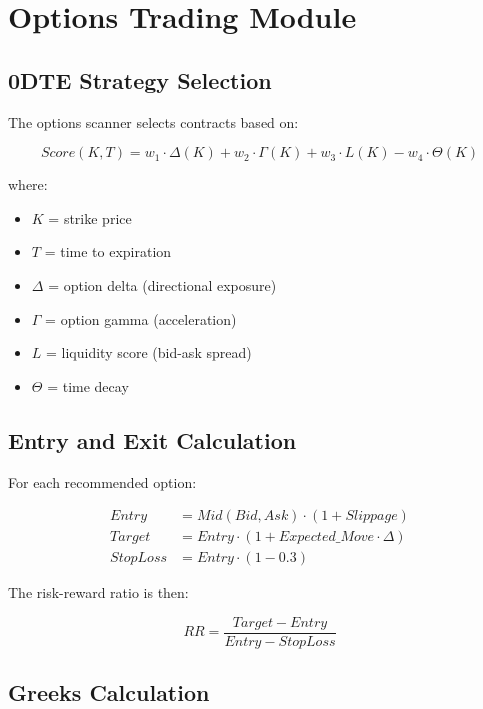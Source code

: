 \documentclass[12pt,a4paper]{article}
\begin{document}
\section{Options Trading Module}

\subsection{0DTE Strategy Selection}

The options scanner selects contracts based on:

\begin{equation}
Score(K, T) = w_1 \cdot \Delta(K) + w_2 \cdot \Gamma(K) + w_3 \cdot L(K) - w_4 \cdot \Theta(K)
\end{equation}

where:
\begin{itemize}
    \item $K$ = strike price
    \item $T$ = time to expiration
    \item $\Delta$ = option delta (directional exposure)
    \item $\Gamma$ = option gamma (acceleration)
    \item $L$ = liquidity score (bid-ask spread)
    \item $\Theta$ = time decay
\end{itemize}

\subsection{Entry and Exit Calculation}

For each recommended option:

\begin{align}
Entry &= Mid(Bid, Ask) \cdot (1 + Slippage) \\
Target &= Entry \cdot (1 + Expected\_Move \cdot \Delta) \\
StopLoss &= Entry \cdot (1 - 0.3)
\end{align}

The risk-reward ratio is then:

\begin{equation}
RR = \frac{Target - Entry}{Entry - StopLoss}
\end{equation}

\subsection{Greeks Calculation}
\end{document}
